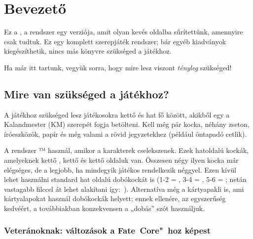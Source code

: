 \chapter{Bevezető}

Ez a , a  rendszer egy verziója, amit olyan kevés oldalba sűrítettünk, amennyire csak tudtuk. Ez egy komplett szerepjáték rendszer; bár egyéb kiadványok kiegészíthetik, nincs más könyvre szükséged a játékhoz.

Ha már itt tartunk, vegyük sorra, hogy mire lesz viszont \emph{tényleg} szükséged!

\section{Mire van szükséged a játékhoz?}

A  játékhoz szükséged lesz játékosokra kettő és hat fő között, akikből egy a Kalandmester (KM) szerepét fogja betölteni. Kell még pár kocka, néhány zseton, íróeszközök, papír és még valami a rövid jegyzetekhez (például öntapadó cetlik).

A  rendszer ™ használ, amikor a karakterek cselekszenek. Ezek hatoldalú kockák, amelyeknek kettő , kettő \dice{+} és kettő \dice{-} oldaluk van. Összesen négy ilyen kocka már elégséges, de a legjobb, ha mindegyik játékos rendelkezik néggyel. Ezen kívül lehet használni standard hat oldalú dobókockát is (1‑2 = \dice{-}, 3‑4 = , 5‑6 = \dice{+}; netán vastagabb filccel át lehet alakítani így:~). Alternatíva még a  kártyapakli is, ami kártyalapokat használ dobókockák helyett; ennek ellenére, az egyszerűség kedvéért, a továbbiakban konzekvensen a „dobás” szót használjuk.

\subsection{Veteránoknak: változások a Fate~Core"~hoz képest}

